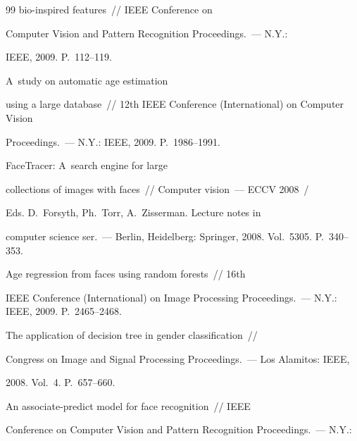 {{\begin{thebibliography}{99}
bio-inspired features~/\!\!/ IEEE Conference on


Computer Vision and Pattern Recognition Proceedings.~--- N.Y.: 


IEEE, 2009. P.~112--119.







 A~study on automatic age estimation 


using a large database~/\!\!/ 12th IEEE Conference (International) on Computer Vision


Proceedings.~---  N.Y.: IEEE, 2009. P.~1986--1991.







 FaceTracer: A~search engine for large 


collections of images with faces~/\!\!/ Computer vision~--- ECCV 2008~/


Eds. D.~Forsyth, Ph.~Torr, A.~Zisserman. Lecture notes in


computer science ser.~--- Berlin, Heidelberg: Springer, 2008. Vol.~5305. P.~340--353. 







 Age regression from faces using random forests~/\!\!/ 16th


IEEE  Conference (International) on Image Processing Proceedings.~--- N.Y.: IEEE, 2009. P.~2465--2468.







 The application of decision tree in gender classification~/\!\!/ 


Congress on Image and Signal Processing Proceedings.~--- Los Alamitos: IEEE, 


2008. Vol.~4. P.~657--660.







 An associate-predict model for face recognition~/\!\!/ IEEE 


Conference on Computer Vision and Pattern Recognition Proceedings.~--- N.Y.: 



\end{thebibliography}}}
